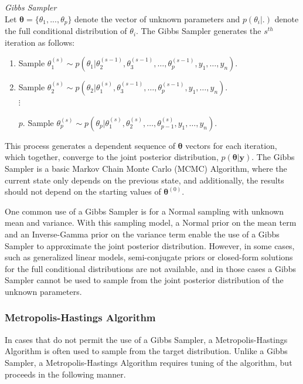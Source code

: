 \documentclass[12pt]{article}\usepackage[]{graphicx}\usepackage[]{color}
\begin{document}
\begin{mdframed}
\textit{Gibbs Sampler} \\
Let $\bm{\theta} = \{\theta_1, ..., \theta_p\}$ denote the vector of unknown parameters and $p(\theta_i|.)$ denote the full conditional distribution of $\theta_i$. The Gibbs Sampler generates the $s^{th}$ iteration as follows:
\begin{enumerate}
\item Sample $\theta_1^{(s)} \sim p(\theta_1|\theta_2^{(s-1)}, \theta_3^{(s-1)}, \dots, \theta_p^{(s-1)}, y_1, \dots, y_n)$. 
\item Sample $\theta_2^{(s)} \sim p(\theta_2|\theta_1^{(s)}, \theta_3^{(s-1)}, \dots, \theta_p^{(s-1)}, y_1, \dots, y_n)$.\\	
$\vdots$ \\[-14mm]
\item[$p$.] Sample $\theta_p^{(s)} \sim p(\theta_p|\theta_1^{(s)}, \theta_2^{(s)}, \dots, \theta_{p-1}^{(s)}, y_1, \dots , y_n)$. 
\end{enumerate}
\end{mdframed}

\noindent This process generates a dependent sequence of $\bm{\theta}$ vectors for each iteration, which together, converge to the joint posterior distribution, $p(\bm{\theta}|\bm{y})$. The Gibbs Sampler is a basic Markov Chain Monte Carlo (MCMC) Algorithm, where the current state only depends on the previous state, and additionally, the results should not depend on the starting values of $\bm{\theta}^{(0)}$.

One common use of a Gibbs Sampler is for a Normal sampling with unknown mean and variance. With this sampling model, a Normal prior on the mean term and an Inverse-Gamma prior on the variance term enable the use of a Gibbs Sampler to approximate the joint posterior distribution. However, in some cases, such as generalized linear models, semi-conjugate priors or closed-form solutions for the full conditional distributions are not available, and in those cases a Gibbs Sampler cannot be used to sample from the joint posterior distribution of the unknown parameters. 

\subsubsection{Metropolis-Hastings Algorithm}

In cases that do not permit the use of a Gibbs Sampler, a Metropolis-Hastings Algorithm is often used to sample from the target distribution. Unlike a Gibbs Sampler, a Metropolis-Hastings Algorithm requires tuning of the algorithm, but proceeds in the following manner. 
\end{document}

